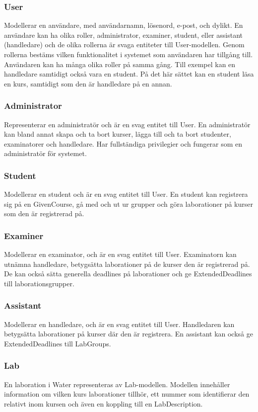 \subsubsection{User}
Modellerar en användare, med användarnamn, lösenord, e-post, och dylikt. En användare kan ha olika roller, administrator, examiner, student, eller assistant (handledare) och de olika rollerna är svaga entiteter till User-modellen. Genom rollerna bestäms vilken funktionalitet i systemet som användaren har tillgång till. Användaren kan ha många olika roller på samma gång. Till exempel kan en handledare samtidigt också vara en student. På det här sättet kan en student läsa en kurs, samtidigt som den är handledare på en annan. 

\subsubsection{Administrator}
Representerar en administratör och är en svag entitet till User. En administratör kan bland annat skapa och ta bort kurser, lägga till och ta bort studenter, examinatorer och handledare. Har fullständiga privilegier och fungerar som en administratör för systemet.

\subsubsection{Student}
Modellerar en student och är en svag entitet till User. En student kan registrera sig på en GivenCourse, gå med och ut ur grupper och göra laborationer på kurser som den är registrerad på. 

\subsubsection{Examiner}
Modellerar en examinator, och är en svag entitet till User. Examinatorn kan utnämna handledare, betygsätta laborationer på de kurser den är registrerad på. De kan också sätta generella deadlines på laborationer och ge ExtendedDeadlines till laborationsgrupper.  

\subsubsection{Assistant}
Modellerar en handledare, och är en svag entitet till User. Handledaren kan betygsätta laborationer på kurser där den är registrera. En assistant kan också ge ExtendedDeadlines till LabGroups. 

\subsubsection{Lab}
En laboration i Water representeras av Lab-modellen. Modellen innehåller information om vilken kurs laborationer tillhör, ett nummer som identifierar den relativt inom kursen och även en koppling till en LabDescription.

